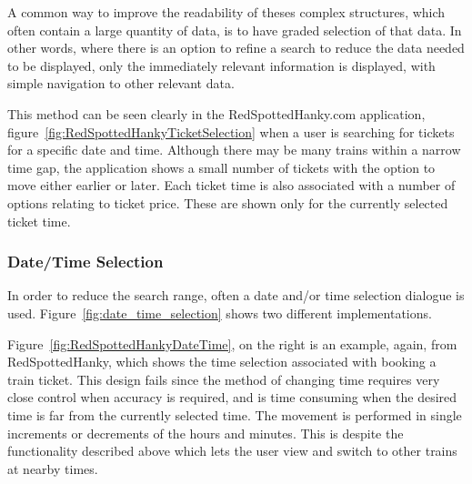A common way to improve the readability of theses complex structures, which
often contain a large quantity of data, is to have graded selection of that
data. In other words, where there is an option to refine a search to reduce the
data needed to be displayed, only the  immediately relevant information is
displayed, with simple navigation to other relevant data.

This method can be seen clearly in the RedSpottedHanky.com application,
figure~\ref{fig:RedSpottedHankyTicketSelection} when a user is searching for
tickets for a specific date and time. Although there may be many trains within
a narrow time gap, the application shows a small number of tickets with the
option to move either earlier or later. Each ticket time is also associated
with a number of options relating to ticket price. These are shown only for the
currently selected ticket time.


\subsubsection{Date/Time Selection}
\label{ssub:date_time_selection}

In order to reduce the search range, often a date and/or time selection
dialogue is used. Figure~\ref{fig:date_time_selection} shows two different
implementations.

Figure~\ref{fig:RedSpottedHankyDateTime}, on the right is an example, again,
from RedSpottedHanky\cite{RedSpottedHanky}, which shows the time selection
associated with booking a train ticket. This design fails since the method of
changing time requires very close control when accuracy is required, and is
time consuming when the desired time is far from the currently selected time.
The movement is performed in single increments or decrements of the hours and
minutes. This is despite the functionality described above which lets the user
view and switch to other trains at nearby times.

